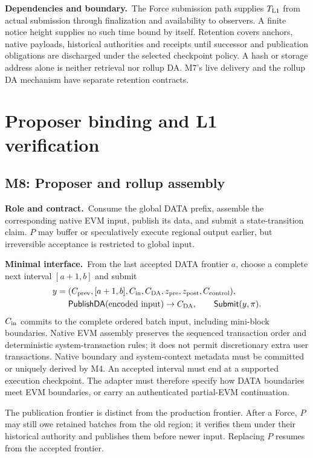 \documentclass[11pt,a4paper]{article}
\newcommand{\api}[1]{\ensuremath{\mathsf{#1}}}
\newcommand{\role}{\textbf{Role and contract.}\ }
\newcommand{\iface}{\textbf{Minimal interface.}\ }
\newcommand{\depends}{\textbf{Dependencies and boundary.}\ }
\begin{document}
\depends The Force submission path supplies $T_{\rm L1}$ from actual
submission through finalization and availability to observers. A finite
notice height supplies no such time bound by itself. Retention covers
anchors, native payloads, historical authorities and receipts until
successor and publication obligations are discharged under the selected
checkpoint policy. A hash or storage address alone is neither retrieval
nor rollup DA. M7's live delivery and the rollup DA mechanism have
separate retention contracts.

\section{Proposer binding and L1 verification}\label{sec:publication}
\subsection{M8: Proposer and rollup assembly}\label{sec:proposer}
\role Consume the global DATA prefix, assemble the corresponding native
EVM input, publish its data, and submit a state-transition claim. $P$ may
buffer or speculatively execute regional output earlier, but irreversible
acceptance is restricted to global input.

\iface From the last accepted DATA frontier $a$, choose a complete next
interval $[a+1,b]$ and submit
\[
\begin{aligned}
 y={}&(C_{\rm prev},[a+1,b],C_{\rm in},C_{\rm DA},
          z_{\rm pre},z_{\rm post},C_{\rm control}),\\
 &\api{PublishDA}(\text{encoded input})\to C_{\rm DA},\qquad
   \api{Submit}(y,\pi).
\end{aligned}
\]
$C_{\rm in}$ commits to the complete ordered batch input, including
mini-block boundaries. Native EVM assembly preserves the sequenced
transaction order and deterministic system-transaction rules; it does
not permit discretionary extra user transactions. Native boundary and
system-context metadata must be committed or uniquely derived by M4.
An accepted interval must end at a supported execution checkpoint.
The adapter must therefore specify how DATA boundaries meet EVM
boundaries, or carry an authenticated partial-EVM continuation.

The publication frontier is distinct from the production frontier.
After a Force, $P$ may still owe retained batches from the old region;
it verifies them under their historical authority and publishes them
before newer input. Replacing $P$ resumes from the accepted frontier.
\end{document}
